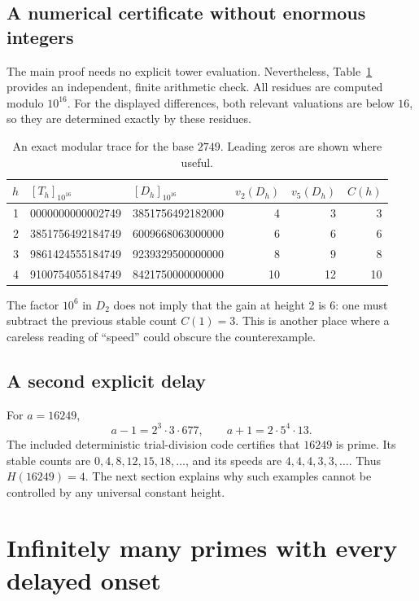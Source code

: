 \documentclass[11pt,letterpaper]{article}
\numberwithin{equation}{section}
\theoremstyle{definition}
\theoremstyle{remark}
\begin{document}
\subsection{A numerical certificate without enormous integers}

The main proof needs no explicit tower evaluation. Nevertheless, Table~\ref{tab:2749trace} provides an independent, finite arithmetic check. All residues are computed modulo $10^{16}$. For the displayed differences, both relevant valuations are below $16$, so they are determined exactly by these residues.

\begin{table}[htbp]
\centering\small
\caption{An exact modular trace for the base $2749$. Leading zeros are shown where useful.}\label{tab:2749trace}
\begin{tabular}{rllrrr}
\toprule
$h$&$[T_h]_{10^{16}}$&$[D_h]_{10^{16}}$&$v_2(D_h)$&$v_5(D_h)$&$C(h)$\\
\midrule
1&0000000000002749&3851756492182000&4&3&3\\
2&3851756492184749&6009668063000000&6&6&6\\
3&9861424555184749&9239329500000000&8&9&8\\
4&9100754055184749&8421750000000000&10&12&10\\
\bottomrule
\end{tabular}
\end{table}

The factor $10^6$ in $D_2$ does not imply that the gain at height 2 is $6$: one must subtract the previous stable count $C(1)=3$. This is another place where a careless reading of ``speed'' could obscure the counterexample.

\subsection{A second explicit delay}

For $a=16249$,
\[
 a-1=2^3\cdot3\cdot677,\qquad a+1=2\cdot5^4\cdot13.
\]
The included deterministic trial-division code certifies that $16249$ is prime. Its stable counts are $0,4,8,12,15,18,\ldots$, and its speeds are $4,4,4,3,3,\ldots$. Thus $H(16249)=4$. The next section explains why such examples cannot be controlled by any universal constant height.

\section{Infinitely many primes with every delayed onset}\label{sec:families}
\end{document}
